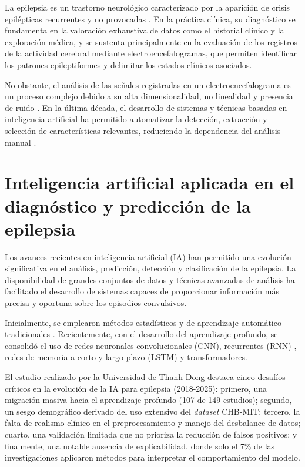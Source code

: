 La epilepsia es un trastorno neurológico caracterizado por la aparición de crisis epilépticas recurrentes y no provocadas \cite{thijs_epilepsy_2019}. En la práctica clínica, su diagnóstico se fundamenta en la valoración exhaustiva de datos como el historial clínico y la exploración médica, y se sustenta principalmente en la evaluación de los registros de la actividad cerebral mediante electroencefalogramas, que permiten identificar los patrones epileptiformes y delimitar los estados clínicos asociados.

No obstante, el análisis de las señales registradas en un electroencefalograma es un proceso complejo debido a su alta dimensionalidad, no linealidad y presencia de ruido \cite{aung_what_2025}. En la última década, el desarrollo de sistemas y técnicas basadas en inteligencia artificial ha permitido automatizar la detección, extracción y selección de características relevantes, reduciendo la dependencia del análisis manual \cite{rasheed_ml_2021}.

\section{Inteligencia artificial aplicada en el diagnóstico y predicción de la epilepsia}

Los avances recientes en inteligencia artificial (IA) han permitido una evolución significativa en el análisis, predicción, detección y clasificación de la epilepsia. La disponibilidad de grandes conjuntos de datos y técnicas avanzadas de análisis ha facilitado el desarrollo de sistemas capaces de proporcionar información más precisa y oportuna sobre los episodios convulsivos.

Inicialmente, se emplearon métodos estadísticos y de aprendizaje automático tradicionales \cite{munsell2015svm}. Recientemente, con el desarrollo del aprendizaje profundo, se consolidó el uso de redes neuronales convolucionales (CNN), recurrentes (RNN) \cite{lee2017riscv}, redes de memoria a corto y largo plazo (LSTM) \cite{najafi2022rnn} y transformadores.

El estudio realizado por la Universidad de Thanh Dong \cite{wu_review_2025} destaca cinco desafíos críticos en la evolución de la IA para epilepsia (2018-2025): primero, una migración masiva hacia el aprendizaje profundo (107 de 149 estudios); segundo, un sesgo demográfico derivado del uso extensivo del \textit{dataset} CHB-MIT; tercero, la falta de realismo clínico en el preprocesamiento y manejo del desbalance de datos; cuarto, una validación limitada que no prioriza la reducción de falsos positivos; y finalmente, una notable ausencia de explicabilidad, donde solo el 7\% de las investigaciones aplicaron métodos para interpretar el comportamiento del modelo.

